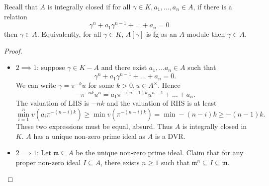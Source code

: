 \documentclass[a4paper]{article}
\theoremstyle{definition}
\begin{document}
Recall that \(A\) is integrally closed if for all \(\gamma \in K, a_1, \dots, a_n \in A\), if
there is a relation
\[
  \gamma^n + a_1 \gamma^{n - 1} + \dots + a_n = 0
\]
then \(\gamma \in A\). Equivalently, for all \(\gamma \in K\), \(A[\gamma]\) is fg as an \(A\)-module then \(\gamma \in A\).

\begin{proof}\leavevmode
  \begin{itemize}
  \item \(2 \implies 1\): suppose \(\gamma \in K - A\) and there exist \(a_1, \dots a_n \in A\) such that
    \[
      \gamma^n + a_1 \gamma^{n - 1} + \dots + a_n = 0.
    \]
    We can write \(\gamma = \pi^{-k} u\) for some \(k > 0, u \in A^\times\). Hence
    \[
      -\pi^{-nk} u^n = a_1 \pi^{-(n - 1)k} u^{n - 1} + \dots + a_n.
    \]
    The valuation of LHS is \(-nk\) and the valuation of RHS is at least
    \[
      \min_{i = 1}^n v(a_i \pi^{- (n - i) k}) \geq \min v(\pi^{-(n - i)k}) = \min -(n - i) k \geq -(n - 1) k.
    \]
    These two expressions must be equal, absurd. Thus \(A\) is integrally closed in \(K\). \(A\) has a unique non-zero prime ideal as \(A\) is a DVR.
  \item \(2 \implies 1\): Let \(\mathfrak m \subseteq A\) be the unique non-zero prime ideal. Claim that for any proper non-zero ideal \(I \subseteq A\), there exists \(n \geq 1\) such that \(\mathfrak m^n \subseteq I \subseteq \mathfrak m\).


\end{itemize}
\end{proof}
\end{document}
